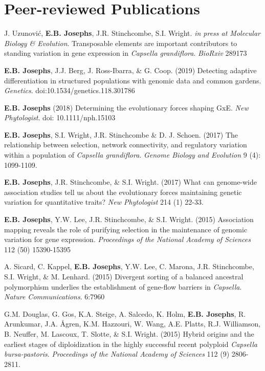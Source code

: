 \documentclass[letterpaper]{article}
\begin{document}
\section*{Peer-reviewed Publications}
\begin{etaremune}
 \setlength{\itemsep}{4pt}
 \setlength{\parskip}{0pt}
 \item J. Uzunovi\'c, \textbf{E.B. Josephs}, J.R. Stinchcombe,  S.I. Wright. \textit{in press at Molecular Biology \& Evolution}. Transposable elements are important contributors to standing variation in gene expression in \textit{Capsella grandiflora}. \textit{BioRxiv} 289173
 \item \textbf{E.B. Josephs}, J.J. Berg, J. Ross-Ibarra, \& G. Coop. (2019) Detecting adaptive differentiation in structured populations with genomic data and common gardens. \textit{Genetics}. doi:10.1534/genetics.118.301786
  \item \textbf{E.B. Josephs} (2018) Determining the evolutionary forces shaping GxE. \textit{New Phytologist}. doi: 10.1111/nph.15103
 \item \textbf{E.B. Josephs}, S.I. Wright, J.R. Stinchcombe \& D. J. Schoen. (2017) The relationship between selection, network connectivity, and regulatory variation within a population of \textit{Capsella grandiflora}. \textit{Genome Biology and Evolution} 9 (4): 1099-1109.
 \item \textbf{E.B. Josephs}, J.R. Stinchcombe, \& S.I. Wright. (2017) What can genome-wide association studies tell us about the evolutionary forces maintaining genetic variation for quantitative traits? \textit{New Phytologist} 214 (1) 22-33.
  \item \textbf{E.B. Josephs}, Y.W. Lee, J.R. Stinchcombe, \& S.I. Wright. (2015) Association mapping reveals the role of purifying selection  in the maintenance of genomic variation for gene expression. \textit{Proceedings of the National Academy of Sciences} 112 (50) 15390-15395
  \item A. Sicard, C. Kappel, \textbf{E.B. Josephs}, Y.W. Lee, C. Marona, J.R. Stinchcombe, S.I. Wright, \& M. Lenhard. (2015) Divergent sorting of a balanced ancestral polymorphism underlies the establishment of gene-flow barriers in \textit{Capsella}. \textit{Nature Communications}. 6:7960
  \item G.M. Douglas, G. Gos, K.A. Steige, A. Salcedo, K. Holm, \textbf{E.B. Josephs}, R. Arunkumar, J.A. \AA gren,  K.M. Hazzouri, W. Wang, A.E. Platts, R.J. Williamson, B. Neuffer, M. Lascoux, T. Slotte, \& S.I. Wright. (2015) Hybrid origins and the earliest stages of diploidization in the highly successful recent polyploid \textit{Capsella bursa-pastoris}. \textit{Proceedings of the National Academy of Sciences} 112 (9) 2806-2811.

\end{etaremune}
\end{document}
